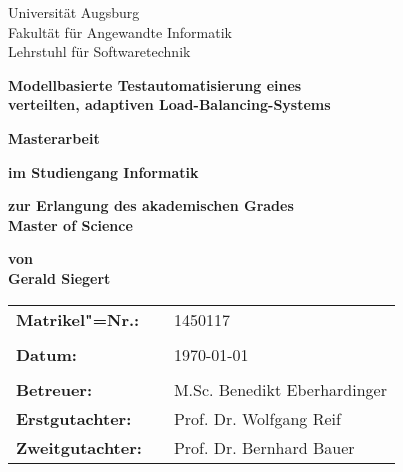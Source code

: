 \begin{center}
    {\Large{Universität Augsburg\\
            Fakultät für Angewandte Informatik\\
            Lehrstuhl für Softwaretechnik}}
    \vspace{3\baselineskip}
    
    \begin{onehalfspace}
        \textbf{\large{Modellbasierte Testautomatisierung eines\\verteilten, adaptiven Load-Balancing-Systems}}
    \end{onehalfspace}
    \vspace{3\baselineskip}
    
    \textbf{{\Large{Masterarbeit}}}
    \vspace{1\baselineskip}
    
    \textbf{im Studiengang Informatik}
    \vspace{1\baselineskip}
    
    \textbf{zur Erlangung des akademischen Grades\\Master of Science}
    \vspace{1\baselineskip}
    
    \textbf{von\\Gerald Siegert}
    \vfill
    
    \begin{singlespace}
        \begin{tabular}{lll}
        	\textbf{Matrikel"=Nr.:}  &  & 1450117                      \\
        	                         &  &                              \\
        	\textbf{Datum:}          &  & \today                       \\
        	                         &  &                              \\
        	\textbf{Betreuer:}       &  & M.Sc. Benedikt Eberhardinger \\
        	\textbf{Erstgutachter:}  &  & Prof. Dr. Wolfgang Reif      \\
        	\textbf{Zweitgutachter:} &  & Prof. Dr. Bernhard Bauer
        \end{tabular}
    \end{singlespace}
\end{center}
